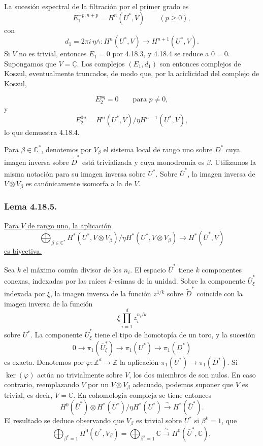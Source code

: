 La sucesión espectral de la filtración por el primer grado es
\[
E_1^{-p,n+p}=H^n(U^*,V)\qquad(p\geq0),
\]
con
\[
d_1=2\pi i\,\eta\wedge:
H^n(U^*,V)\longrightarrow H^{n+1}(U^*,V).
\]
Si $V$ no es trivial, entonces $E_1=0$ por 4.18.3, y 4.18.4 se reduce
a $0=0$. Supongamos que $V=\underline{\mathbb C}$. Los complejos
$(E_1,d_1)$ son entonces complejos de Koszul, eventualmente truncados,
de modo que, por la aciclicidad del complejo de Koszul,

\pageoriginale

\[
E_2^{pq}=0\qquad\text{para }p\ne0,
\]
y
\[
E_2^{0n}=H^n(U^*,V)/\eta H^{n-1}(U^*,V),
\]
lo que demuestra 4.18.4.

Para $\beta\in\mathbb C^*$, denotemos por $V_\beta$ el sistema local
de rango uno sobre $D^*$ cuya imagen inversa sobre $\widetilde D^*$
está trivializada y cuya monodromía es $\beta$. Utilizamos la misma
notación para su imagen inversa sobre $U^*$. Sobre $\bar U^*$, la imagen
inversa de $V\otimes V_\beta$ es canónicamente isomorfa a la de $V$.

\subsubsection*{Lema 4.18.5.}
\underline{Para $V$ de rango uno, la aplicación}
\[
\bigoplus_{\beta\in\mathbb C^*}
H^*(U^*,V\otimes V_\beta)/
 \eta H^*(U^*,V\otimes V_\beta)
\longrightarrow H^*(\bar U^*,V)
\]
\underline{es biyectiva.}

Sea $k$ el máximo común divisor de los $n_i$. El espacio $\bar U^*$
tiene $k$ componentes conexas, indexadas por las raíces $k$-esimas de
la unidad. Sobre la componente $\bar U_\xi^*$ indexada por $\xi$, la
imagen inversa de la función $z^{1/k}$ sobre $\widetilde D^*$ coincide
con la imagen inversa de la función
\[
\xi\prod_{i=1}^d z_i^{n_i/k}
\]
sobre $U^*$. La componente $\bar U_\xi^*$ tiene el tipo de homotopía de
un toro, y la sucesión
\[
0\longrightarrow\pi_1(\bar U_\xi^*)
 \longrightarrow\pi_1(U^*)\longrightarrow\pi_1(D^*)
\]
es exacta. Denotemos por $\varphi:\mathbb Z^d\to\mathbb Z$ la
aplicación $\pi_1(U^*)\to\pi_1(D^*)$. Si $\ker(\varphi)$ actúa no
trivialmente sobre $V$, los dos miembros de
 son nulos. En caso contrario, reemplazando $V$
por un $V\otimes V_\beta$ adecuado, podemos suponer que $V$ es trivial,
es decir, $V=\mathbb C$. En cohomología compleja se tiene entonces
\[
H^0(\bar U^*)\otimes
 H^*(U^*)/\eta H^*(U^*)
 \xrightarrow{\ \sim\ }H^*(\bar U^*).
\]
El resultado se deduce observando que $V_\beta$ es trivial sobre $U^*$
si $\beta^k=1$, que
\[
\bigoplus_{\beta^k=1}H^0(U^*,V_\beta)
=\bigoplus_{\beta^k=1}\mathbb C
 \xrightarrow{\ \sim\ }H^0(\bar U^*,\mathbb C),
\]

